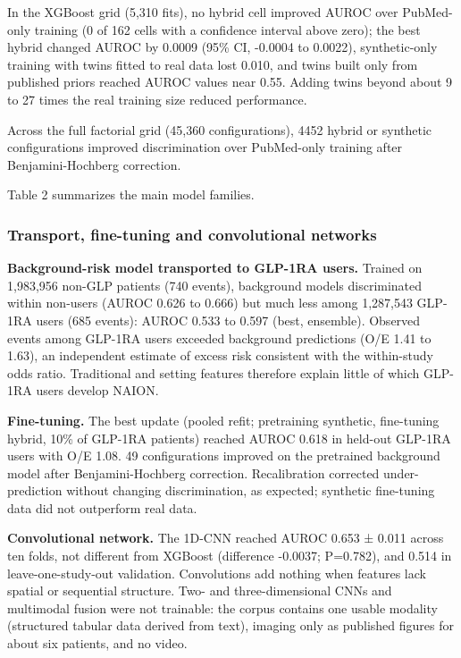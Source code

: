 \documentclass[
  11pt,
]{article}
\begin{document}
In the XGBoost grid (5,310 fits), no hybrid cell improved AUROC over
PubMed-only training (0 of 162 cells with a confidence interval above
zero); the best hybrid changed AUROC by 0.0009 (95\% CI, -0.0004 to
0.0022), synthetic-only training with twins fitted to real data lost
0.010, and twins built only from published priors reached AUROC values
near 0.55. Adding twins beyond about 9 to 27 times the real training
size reduced performance.

Across the full factorial grid (45,360 configurations), 4452 hybrid or
synthetic configurations improved discrimination over PubMed-only
training after Benjamini-Hochberg correction.

Table 2 summarizes the main model families.

\subsubsection{Transport, fine-tuning and convolutional
networks}\label{transport-fine-tuning-and-convolutional-networks}

\textbf{Background-risk model transported to GLP-1RA users.} Trained on
1,983,956 non-GLP patients (740 events), background models discriminated
within non-users (AUROC 0.626 to 0.666) but much less among 1,287,543
GLP-1RA users (685 events): AUROC 0.533 to 0.597 (best, ensemble).
Observed events among GLP-1RA users exceeded background predictions (O/E
1.41 to 1.63), an independent estimate of excess risk consistent with
the within-study odds ratio. Traditional and setting features therefore
explain little of which GLP-1RA users develop NAION.

\textbf{Fine-tuning.} The best update (pooled refit; pretraining
synthetic, fine-tuning hybrid, 10\% of GLP-1RA patients) reached AUROC
0.618 in held-out GLP-1RA users with O/E 1.08. 49 configurations
improved on the pretrained background model after Benjamini-Hochberg
correction. Recalibration corrected under-prediction without changing
discrimination, as expected; synthetic fine-tuning data did not
outperform real data.

\textbf{Convolutional network.} The 1D-CNN reached AUROC 0.653 ± 0.011
across ten folds, not different from XGBoost (difference -0.0037;
P=0.782), and 0.514 in leave-one-study-out validation. Convolutions add
nothing when features lack spatial or sequential structure. Two- and
three-dimensional CNNs and multimodal fusion were not trainable: the
corpus contains one usable modality (structured tabular data derived
from text), imaging only as published figures for about six patients,
and no video.
\end{document}
